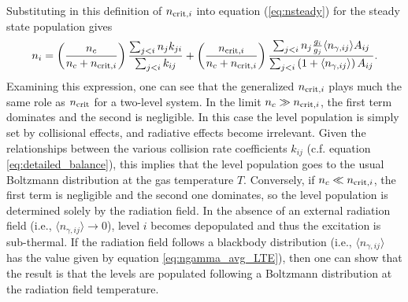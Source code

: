 Substituting in this definition of $n_{{\rm crit},i}$ into equation (\ref{eq:nsteady}) for the steady state population gives
\begin{equation}
n_i = \left(\frac{n_c}{n_c+n_{{\rm crit},i}}\right) \frac{\sum_{j<i} n_j k_{ji}}{\sum_{j<i} k_{ij}}
+ \left(\frac{n_{{\rm crit},i}}{n_c+n_{{\rm crit},i}}\right) \frac{\sum_{j<i} n_j \frac{g_i}{g_j} \langle n_{\gamma,ij}\rangle A_{ij}}{\sum_{j<i} \left(1+\langle n_{\gamma,ij}\rangle\right) A_{ij}}.
\end{equation}
Examining this expression, one can see that the generalized $n_{{\rm crit},i}$ plays much the same role as $n_{\rm crit}$ for a two-level system. In the limit $n_c \gg n_{{\rm crit},i}$, the first term dominates and the second is negligible. In this case the level population is simply set by collisional effects, and radiative effects become irrelevant. Given the relationships between the various collision rate coefficients $k_{ij}$ (c.f. equation \ref{eq:detailed_balance}), this implies that the level population goes to the usual Boltzmann distribution at the gas temperature $T$. Conversely, if $n_c \ll n_{{\rm crit},i}$, the first term is negligible and the second one dominates, so the level population is determined solely by the radiation field. In the absence of an external radiation field (i.e., $\langle n_{\gamma,ij}\rangle \rightarrow 0$), level $i$ becomes depopulated and thus the excitation is sub-thermal. If the radiation field follows a blackbody distribution (i.e., $\langle n_{\gamma,ij}\rangle$ has the value given by equation \ref{eq:ngamma_avg_LTE}), then one can show that the result is that the levels are populated following a Boltzmann distribution at the radiation field temperature.
